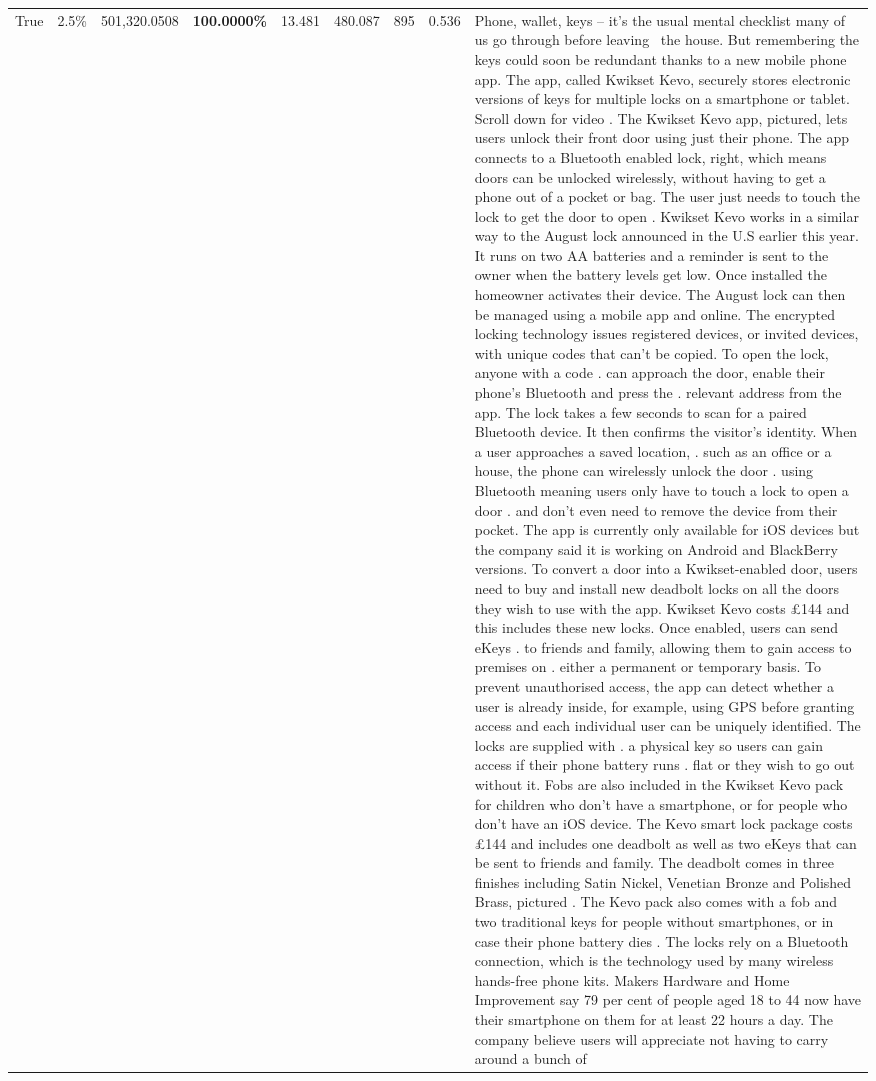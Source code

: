 \begin{table}[H]
\begin{tabular}{lllrlllll}
True & 2.5\% & 501,320.0508 & \bfseries \color{red} 100.0000\% & 13.481 & 480.087 & 895 & 0.536 & Phone, wallet, keys – it’s the usual mental checklist many of us go through before leaving  the house. But remembering the keys could soon be redundant thanks to a new mobile phone app. The app, called Kwikset Kevo, securely stores electronic versions of keys for multiple locks on a smartphone or tablet. Scroll down for video . The Kwikset Kevo app, pictured, lets users unlock their front door using just their phone. The app connects to a Bluetooth enabled lock, right, which means doors can be unlocked wirelessly, without having to get a phone out of a pocket or bag. The user just needs to touch the lock to get the door to open . Kwikset Kevo works in a similar way to the August lock announced in the U.S earlier this year. It runs on two AA batteries and a reminder is sent to the owner when the battery levels get low. Once installed the homeowner activates their device. The August lock can then be managed using a mobile app and online. The encrypted locking technology issues registered devices, or invited devices, with unique codes that can't be copied. To open the lock, anyone with a code . can approach the door, enable their phone's Bluetooth and press the . relevant address from the app. The lock takes a few seconds to scan for a paired Bluetooth device. It then confirms the visitor's identity. When a user approaches a saved location, . such as an office or a house, the phone can wirelessly unlock the door . using Bluetooth meaning users only have to touch a lock to open a door . and don't even need to remove the device from their pocket. The app is currently only available for iOS devices but the company said it is working on Android and BlackBerry versions. To convert a door into a Kwikset-enabled door, users need to buy and install new deadbolt locks on all the doors they wish to use with the app. Kwikset Kevo costs £144 and this includes these new locks. Once enabled, users can send eKeys . to friends and family, allowing them to gain access to premises on . either a permanent or temporary basis. To prevent unauthorised access, the app can detect whether a user is already inside, for example, using GPS before granting access and each individual user can be uniquely identified. The locks are supplied with . a physical key so users can gain access if their phone battery runs . flat or they wish to go out without it. Fobs are also included in the Kwikset Kevo pack for children who don't have a smartphone, or for people who don't have an iOS device. The Kevo smart lock package costs £144 and includes one deadbolt as well as two eKeys that can be sent to friends and family. The deadbolt comes in three finishes including Satin Nickel, Venetian Bronze and Polished Brass, pictured . The Kevo pack also comes with a fob and two traditional keys for people without smartphones, or in case their phone battery dies . The locks rely on a Bluetooth connection, which is the technology used by many wireless hands-free phone kits. Makers Hardware and Home Improvement say 79 per cent of people aged 18 to 44 now have their smartphone on them for at least 22 hours a day. The company believe users will appreciate not having to carry around a bunch of 
\end{tabular}
\end{table}
